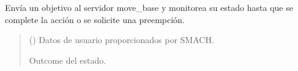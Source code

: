 \documentclass[a4paper,10pt,spanish]{sphinxmanual}
\begin{document}
\begin{fulllineitems}
\begin{fulllineitems}
\sphinxAtStartPar
Envía un objetivo al servidor move\_base y monitorea su estado hasta que se
complete la acción o se solicite una preempción.
\begin{quote}\begin{description}
\sphinxAtStartPar
{} () \textendash{} Datos de usuario proporcionados por SMACH.

\sphinxAtStartPar
Outcome del estado.

\sphinxAtStartPar
{}

\end{description}\end{quote}

\end{fulllineitems}


\end{fulllineitems}

\end{document}
